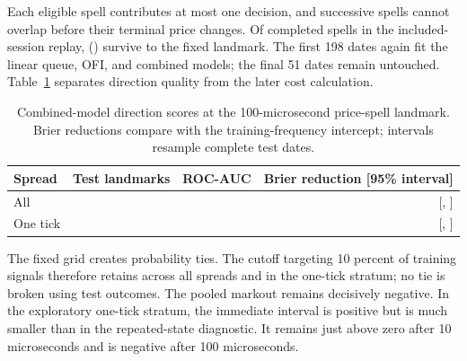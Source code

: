 \documentclass[11pt,a4paper]{article}
\begin{document}
Each eligible spell contributes at most one decision, and successive spells
cannot overlap before their terminal price changes. Of
\LandmarkCompletedSpells{} completed spells in the included-session replay,
\LandmarkEligibleSpells{} (\LandmarkEligibleFraction{}) survive to the fixed
landmark. The first 198 dates again fit the linear queue, OFI, and combined
models; the final 51 dates remain untouched. Table~\ref{tab:landmark-direction}
separates direction quality from the later cost calculation.

\begin{table}[H]
  \centering
  \caption{Combined-model direction scores at the 100-microsecond price-spell
  landmark. Brier reductions compare with the training-frequency intercept;
  intervals resample complete test dates.}
  \label{tab:landmark-direction}
  \small
  \begin{tabular}{lrrr}
    \toprule
    Spread & Test landmarks & ROC-AUC & Brier reduction [95\% interval] \\
    \midrule
    All & \LandmarkAllTest{} & \LandmarkAllAuc{} &
      \LandmarkAllBrierReduction{} [\LandmarkAllBrierLower{}, \LandmarkAllBrierUpper{}] \\
    One tick & \LandmarkOneTickTest{} & \LandmarkOneTickAuc{} &
      \LandmarkOneTickBrierReduction{} [\LandmarkOneTickBrierLower{}, \LandmarkOneTickBrierUpper{}] \\
    \bottomrule
  \end{tabular}
\end{table}

The fixed grid creates probability ties. The cutoff targeting 10 percent of
training signals therefore retains \LandmarkAllCoverage{} across all spreads
and \LandmarkOneTickCoverage{} in the one-tick stratum; no tie is broken using
test outcomes. The pooled markout remains decisively negative. In the
exploratory one-tick stratum, the immediate interval is positive but is much
smaller than in the repeated-state diagnostic. It remains just above zero
after 10 microseconds and is negative after 100 microseconds.
\end{document}
